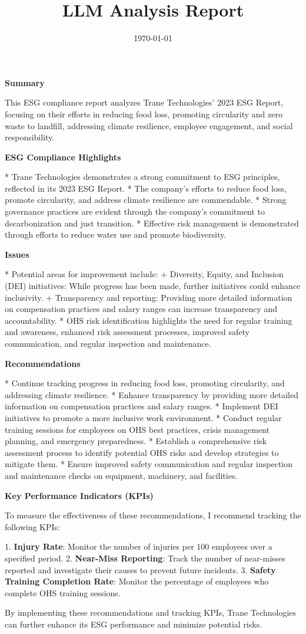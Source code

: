 \documentclass{article}
\title{LLM Analysis Report}
\date{\today}
\begin{document}
                \maketitle

                \textbf{Summary}

This ESG compliance report analyzes Trane Technologies' 2023 ESG Report, focusing on their efforts in reducing food loss, promoting circularity and zero waste to landfill, addressing climate resilience, employee engagement, and social responsibility.

\textbf{ESG Compliance Highlights}

* Trane Technologies demonstrates a strong commitment to ESG principles, reflected in its 2023 ESG Report.
* The company's efforts to reduce food loss, promote circularity, and address climate resilience are commendable.
* Strong governance practices are evident through the company's commitment to decarbonization and just transition.
* Effective risk management is demonstrated through efforts to reduce water use and promote biodiversity.

\textbf{Issues}

* Potential areas for improvement include:
	+ Diversity, Equity, and Inclusion (DEI) initiatives: While progress has been made, further initiatives could enhance inclusivity.
	+ Transparency and reporting: Providing more detailed information on compensation practices and salary ranges can increase transparency and accountability.
* OHS risk identification highlights the need for regular training and awareness, enhanced risk assessment processes, improved safety communication, and regular inspection and maintenance.

\textbf{Recommendations}

* Continue tracking progress in reducing food loss, promoting circularity, and addressing climate resilience.
* Enhance transparency by providing more detailed information on compensation practices and salary ranges.
* Implement DEI initiatives to promote a more inclusive work environment.
* Conduct regular training sessions for employees on OHS best practices, crisis management planning, and emergency preparedness.
* Establish a comprehensive risk assessment process to identify potential OHS risks and develop strategies to mitigate them.
* Ensure improved safety communication and regular inspection and maintenance checks on equipment, machinery, and facilities.

\textbf{Key Performance Indicators (KPIs)}

To measure the effectiveness of these recommendations, I recommend tracking the following KPIs:

1. \textbf{Injury Rate}: Monitor the number of injuries per 100 employees over a specified period.
2. \textbf{Near-Miss Reporting}: Track the number of near-misses reported and investigate their causes to prevent future incidents.
3. \textbf{Safety Training Completion Rate}: Monitor the percentage of employees who complete OHS training sessions.

By implementing these recommendations and tracking KPIs, Trane Technologies can further enhance its ESG performance and minimize potential risks.

                
\end{document}
